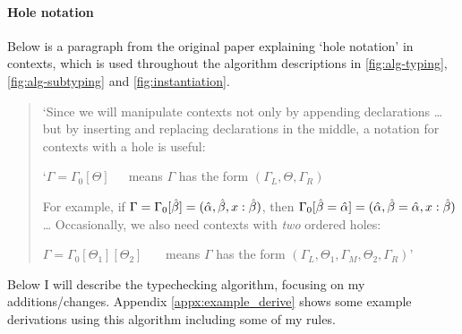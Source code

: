\paragraph{Hole notation}
Below is a paragraph from the original paper \cite{completebidir} explaining `hole notation' in contexts, which is used throughout the algorithm descriptions in \ref{fig:alg-typing}, \ref{fig:alg-subtyping} and \ref{fig:instantiation}. 
\begin{quote}
`Since we will manipulate contexts not only by appending declarations \dots but by inserting and replacing declarations in the middle, a notation for contexts with a hole is useful:
\vspace{-4pt}
\begin{displ}
  `$\Gamma = \Gamma_0[\Theta]$~~~means $\Gamma$ has the form $(\Gamma_L, \Theta, \Gamma_R)$
\end{displ}
For example, if $\Gamma = \Gamma_0[\hat{\beta}] = (\hat{\alpha}, \hat{\beta}, x : \hat{\beta})$,
then $\Gamma_0[{\hat{\beta}} = {\hat{\alpha}}] = (\hat{\alpha}, {\hat{\beta}} = {\hat{\alpha}}, x : \hat{\beta})$
\newline\dots\newline
Occasionally, we also need contexts with \emph{two} ordered holes:
\begin{displ}
  $\Gamma = \Gamma_0[\Theta_1][\Theta_2]$
  ~~~means
  $\Gamma$ has the form $(\Gamma_L, \Theta_1, \Gamma_M, \Theta_2, \Gamma_R)$' \cite{completebidir}
\end{displ}
\end{quote}

\noindent Below I will describe the typechecking algorithm, focusing on my additions/changes. Appendix \ref{appx:example_derive} shows some example derivations using this algorithm including some of my rules. 

